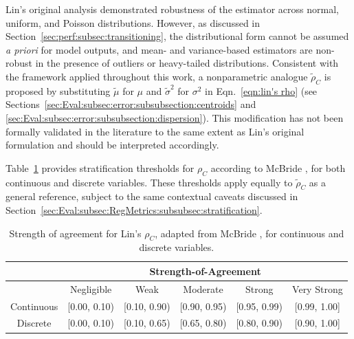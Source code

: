 Lin's original analysis \cite{Lin1989} demonstrated robustness of the estimator across normal, uniform, and Poisson distributions. However, as discussed in Section~\ref{sec:perf:subsec:transitioning}, the distributional form cannot be assumed \textit{a priori} for \DL model outputs, and mean- and variance-based estimators are non-robust in the presence of outliers or heavy-tailed distributions. Consistent with the framework applied throughout this work, a nonparametric analogue $\widetilde{\rho}_C$ is proposed by substituting $\widetilde{\mu}$ for $\mu$ and $\widetilde{\sigma}^2$ for $\sigma^2$ in Eqn.~\ref{eqn:lin's rho} (see Sections~\ref{sec:Eval:subsec:error:subsubsection:centroids} and \ref{sec:Eval:subsec:error:subsubsection:dispersion}). This modification has not been formally validated in the literature to the same extent as Lin's original formulation and should be interpreted accordingly.

Table~\ref{tab:SoA rho_c values} provides stratification thresholds for $\rho_C$ according to McBride \cite{McBride2005}, for both continuous and discrete variables. These thresholds apply equally to $\widetilde{\rho}_C$ as a general reference, subject to the same contextual caveats discussed in Section~\ref{sec:Eval:subsec:RegMetrics:subsubsec:stratification}.
\begin{table}[ht]
    \centering
    \begin{tabular}{|c||c|c|c|c|c|}\hline
        & \multicolumn{5}{c|}{Strength-of-Agreement} \\\hline
        & Negligible & Weak & Moderate & Strong & Very Strong \\\hline \hline
        Continuous & [0.00, 0.10) & [0.10, 0.90) & [0.90, 0.95) & [0.95, 0.99) & [0.99, 1.00] \\
        Discrete & [0.00, 0.10) & [0.10, 0.65) & [0.65, 0.80) & [0.80, 0.90) & [0.90, 1.00] \\
        \hline 
    \end{tabular}
    \caption{Strength of agreement for Lin's $\rho_C$, adapted from McBride \cite{McBride2005}, for continuous and discrete variables.}
    \label{tab:SoA rho_c values}
\end{table}

